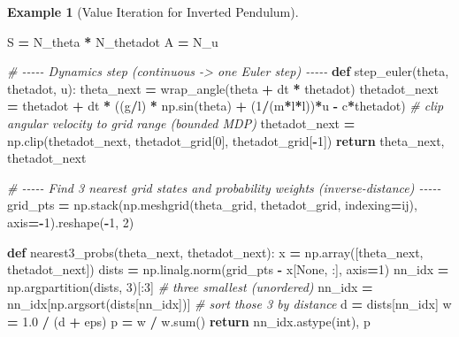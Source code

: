 \documentclass[
]{book}
\newenvironment{Shaded}{\begin{snugshade}}{\end{snugshade}}
\newcommand{\BuiltInTok}[1]{#1}
\newcommand{\CommentTok}[1]{\textcolor[rgb]{0.56,0.35,0.01}{\textit{#1}}}
\newcommand{\ControlFlowTok}[1]{\textcolor[rgb]{0.13,0.29,0.53}{\textbf{#1}}}
\newcommand{\DecValTok}[1]{\textcolor[rgb]{0.00,0.00,0.81}{#1}}
\newcommand{\FloatTok}[1]{\textcolor[rgb]{0.00,0.00,0.81}{#1}}
\newcommand{\KeywordTok}[1]{\textcolor[rgb]{0.13,0.29,0.53}{\textbf{#1}}}
\newcommand{\NormalTok}[1]{#1}
\newcommand{\OperatorTok}[1]{\textcolor[rgb]{0.81,0.36,0.00}{\textbf{#1}}}
\newcommand{\StringTok}[1]{\textcolor[rgb]{0.31,0.60,0.02}{#1}}
\newcommand{\VariableTok}[1]{\textcolor[rgb]{0.00,0.00,0.00}{#1}}
\theoremstyle{definition}
\theoremstyle{definition}
\newtheorem{example}{Example}[chapter]
\theoremstyle{definition}
\theoremstyle{definition}
\theoremstyle{remark}
\begin{document}
\begin{example}[Value Iteration for Inverted Pendulum]
\begin{Shaded}
\begin{Highlighting}[]
\NormalTok{S }\OperatorTok{=}\NormalTok{ N\_theta }\OperatorTok{*}\NormalTok{ N\_thetadot}
\NormalTok{A }\OperatorTok{=}\NormalTok{ N\_u}

\CommentTok{\# {-}{-}{-}{-}{-} Dynamics step (continuous {-}\textgreater{} one Euler step) {-}{-}{-}{-}{-}}
\KeywordTok{def}\NormalTok{ step\_euler(theta, thetadot, u):}
\NormalTok{    theta\_next }\OperatorTok{=}\NormalTok{ wrap\_angle(theta }\OperatorTok{+}\NormalTok{ dt }\OperatorTok{*}\NormalTok{ thetadot)}
\NormalTok{    thetadot\_next }\OperatorTok{=}\NormalTok{ thetadot }\OperatorTok{+}\NormalTok{ dt }\OperatorTok{*}\NormalTok{ ((g}\OperatorTok{/}\NormalTok{l) }\OperatorTok{*}\NormalTok{ np.sin(theta) }\OperatorTok{+}\NormalTok{ (}\DecValTok{1}\OperatorTok{/}\NormalTok{(m}\OperatorTok{*}\NormalTok{l}\OperatorTok{*}\NormalTok{l))}\OperatorTok{*}\NormalTok{u }\OperatorTok{{-}}\NormalTok{ c}\OperatorTok{*}\NormalTok{thetadot)}
    \CommentTok{\# clip angular velocity to grid range (bounded MDP)}
\NormalTok{    thetadot\_next }\OperatorTok{=}\NormalTok{ np.clip(thetadot\_next, thetadot\_grid[}\DecValTok{0}\NormalTok{], thetadot\_grid[}\OperatorTok{{-}}\DecValTok{1}\NormalTok{])}
    \ControlFlowTok{return}\NormalTok{ theta\_next, thetadot\_next}

\CommentTok{\# {-}{-}{-}{-}{-} Find 3 nearest grid states and probability weights (inverse{-}distance) {-}{-}{-}{-}{-}}
\NormalTok{grid\_pts }\OperatorTok{=}\NormalTok{ np.stack(np.meshgrid(theta\_grid, thetadot\_grid, indexing}\OperatorTok{=}\StringTok{\textquotesingle{}ij\textquotesingle{}}\NormalTok{), axis}\OperatorTok{={-}}\DecValTok{1}\NormalTok{).reshape(}\OperatorTok{{-}}\DecValTok{1}\NormalTok{, }\DecValTok{2}\NormalTok{)}

\KeywordTok{def}\NormalTok{ nearest3\_probs(theta\_next, thetadot\_next):}
\NormalTok{    x }\OperatorTok{=}\NormalTok{ np.array([theta\_next, thetadot\_next])}
\NormalTok{    dists }\OperatorTok{=}\NormalTok{ np.linalg.norm(grid\_pts }\OperatorTok{{-}}\NormalTok{ x[}\VariableTok{None}\NormalTok{, :], axis}\OperatorTok{=}\DecValTok{1}\NormalTok{)}
\NormalTok{    nn\_idx }\OperatorTok{=}\NormalTok{ np.argpartition(dists, }\DecValTok{3}\NormalTok{)[:}\DecValTok{3}\NormalTok{]      }\CommentTok{\# three smallest (unordered)}
\NormalTok{    nn\_idx }\OperatorTok{=}\NormalTok{ nn\_idx[np.argsort(dists[nn\_idx])]  }\CommentTok{\# sort those 3 by distance}
\NormalTok{    d }\OperatorTok{=}\NormalTok{ dists[nn\_idx]}
\NormalTok{    w }\OperatorTok{=} \FloatTok{1.0} \OperatorTok{/}\NormalTok{ (d }\OperatorTok{+}\NormalTok{ eps)}
\NormalTok{    p }\OperatorTok{=}\NormalTok{ w }\OperatorTok{/}\NormalTok{ w.}\BuiltInTok{sum}\NormalTok{()}
    \ControlFlowTok{return}\NormalTok{ nn\_idx.astype(}\BuiltInTok{int}\NormalTok{), p}


\end{Highlighting}
\end{Shaded}
\end{example}
\end{document}
